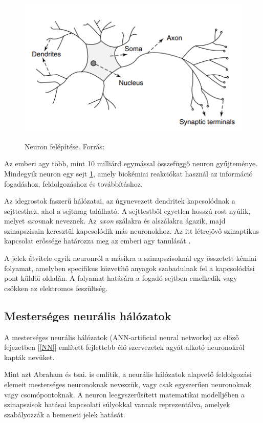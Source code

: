 \documentclass[12pt,a4]{article}
\begin{document}
    \begin{figure}[h]	
		\centering
		\includegraphics[width=0.8\linewidth]{neuron1}
        \label{fig:neuron1}
		\caption{Neuron felépítése. 
			Forrás:\cite{ann}}
	\end{figure}
 
	Az emberi agy több, mint 10 milliárd egymással összefüggő neuron gyűjteménye. Mindegyik neuron egy sejt \ref{fig:neuron1}, amely biokémiai reakciókat használ az információ fogadáshoz, feldolgozáshoz és továbbításhoz.
	
	Az idegrostok faszerű hálózatai, az úgynevezett dendritek kapcsolódnak a sejttesthez, ahol a sejtmag található. A sejttestből egyetlen hosszú rost nyúlik, melyet \textit{axon}nak neveznek. Az \textit{axon} szálakra és alszálakra ágazik, majd szinapszisain keresztül kapcsolódik más neuronokhoz. Az itt létrejövő szinaptikus kapcsolat erőssége határozza meg az emberi agy tanulását .
	
	A jelek átvitele egyik neuronról a másikra a szinapszisoknál egy összetett kémiai folyamat, amelyben specifikus közvetítő anyagok szabadulnak fel a kapcsolódási pont küldői oldalán. A folyamat hatására a fogadó sejtben emelkedik vagy csökken az elektromos feszültség.
	
	\subsection{Mesterséges neurális hálózatok}
	A mesterséges neurális hálózatok (ANN-artificial neural networks) az előző fejezetben [\autoref{NN}] említett fejlettebb élő szervezetek agyát alkotó neuronokról kapták nevüket. 
	
	Mint azt \cite{ann}Abraham és tsai. is említik, a neurális hálózatok alapvető feldolgozási elemeit mesterséges neuronoknak nevezzük, vagy csak egyszerűen neuronoknak vagy csomópontoknak. A neuron leegyszerűsített matematikai modelljében a szinapszisok hatásai kapcsolati súlyokkal vannak reprezentálva, amelyek szabályozzák a bemeneti jelek hatását.
	
\end{document}
